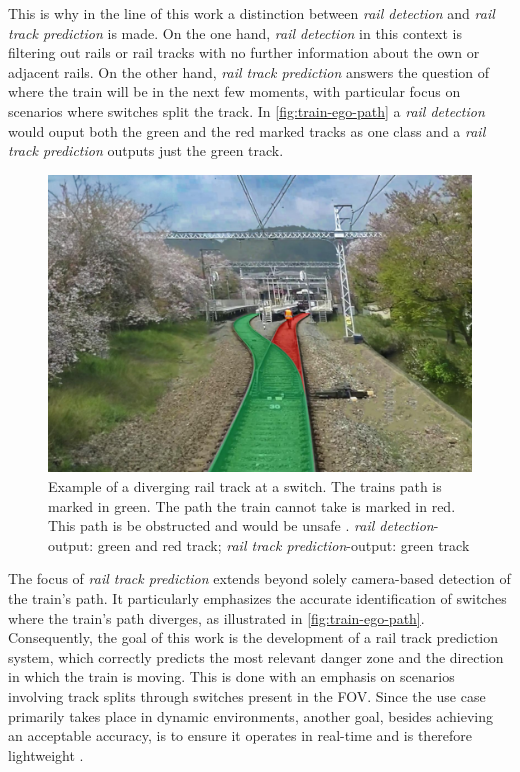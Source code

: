 This is why in the line of this work a distinction between \textit{rail detection} and \textit{rail track prediction} is made.
On the one hand, \textit{rail detection} in this context is filtering out rails or rail tracks with no further information about the own or adjacent rails.
On the other hand, \textit{rail track prediction} answers the question of where the train will be in the next few moments, with particular focus on scenarios where switches split the track.
In \autoref{fig:train-ego-path} a \textit{rail detection} would ouput both the green and the red marked tracks as one class and a \textit{rail track prediction} outputs just the green track.

\vspace{0.5cm} %

\begin{figure}[H]
    \centering
    \includegraphics[width=0.5\linewidth]{PICs/Introduction/train-ego-path.png}
    \caption{Example of a diverging rail track at a switch. The trains path is marked in green. The path the train cannot take is marked in red. This path is be obstructed and would be unsafe \cite{tepNet2024}. \textit{rail detection}-output: green and red track; \textit{rail track prediction}-output: green track}
    \label{fig:train-ego-path}
\end{figure}

The focus of \textit{rail track prediction} extends beyond solely camera-based detection of the train's path.
It particularly emphasizes the accurate identification of switches where the train's path diverges, as illustrated in \autoref{fig:train-ego-path}.
Consequently, the goal of this work is the development of a rail track prediction system, which correctly predicts the most relevant danger zone and the direction in which the train is moving.
This is done with an emphasis on scenarios involving track splits through switches present in the \ac{FOV}.
Since the use case primarily takes place in dynamic environments, another goal, besides achieving an acceptable accuracy, is to ensure it operates in real-time and is therefore lightweight \cite{tepNet2024}.

